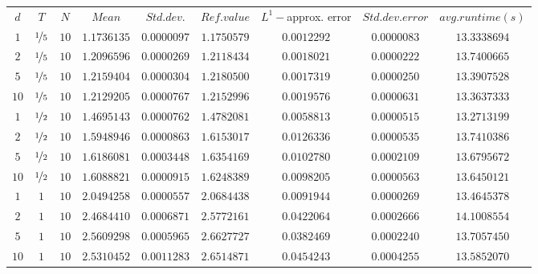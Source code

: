 \begin{tabular}{ccccccccc}
$d$ & $T$ & $N$ & $Mean$ & $Std. dev.$ & $Ref. value$ & $L^1-$approx. error & $Std. dev. error$ & $avg. runtime (s)$\\
$1$ & $\nicefrac{1}{5}$ & $10$ & $1.1736135$ & $0.0000097$ & $1.1750579$ & $0.0012292$ & $0.0000083$ & $13.3338694$\\
$2$ & $\nicefrac{1}{5}$ & $10$ & $1.2096596$ & $0.0000269$ & $1.2118434$ & $0.0018021$ & $0.0000222$ & $13.7400665$\\
$5$ & $\nicefrac{1}{5}$ & $10$ & $1.2159404$ & $0.0000304$ & $1.2180500$ & $0.0017319$ & $0.0000250$ & $13.3907528$\\
$10$ & $\nicefrac{1}{5}$ & $10$ & $1.2129205$ & $0.0000767$ & $1.2152996$ & $0.0019576$ & $0.0000631$ & $13.3637333$\\
$1$ & $\nicefrac{1}{2}$ & $10$ & $1.4695143$ & $0.0000762$ & $1.4782081$ & $0.0058813$ & $0.0000515$ & $13.2713199$\\
$2$ & $\nicefrac{1}{2}$ & $10$ & $1.5948946$ & $0.0000863$ & $1.6153017$ & $0.0126336$ & $0.0000535$ & $13.7410386$\\
$5$ & $\nicefrac{1}{2}$ & $10$ & $1.6186081$ & $0.0003448$ & $1.6354169$ & $0.0102780$ & $0.0002109$ & $13.6795672$\\
$10$ & $\nicefrac{1}{2}$ & $10$ & $1.6088821$ & $0.0000915$ & $1.6248389$ & $0.0098205$ & $0.0000563$ & $13.6450121$\\
$1$ & $1$ & $10$ & $2.0494258$ & $0.0000557$ & $2.0684438$ & $0.0091944$ & $0.0000269$ & $13.4645378$\\
$2$ & $1$ & $10$ & $2.4684410$ & $0.0006871$ & $2.5772161$ & $0.0422064$ & $0.0002666$ & $14.1008554$\\
$5$ & $1$ & $10$ & $2.5609298$ & $0.0005965$ & $2.6627727$ & $0.0382469$ & $0.0002240$ & $13.7057450$\\
$10$ & $1$ & $10$ & $2.5310452$ & $0.0011283$ & $2.6514871$ & $0.0454243$ & $0.0004255$ & $13.5852070$\\
\end{tabular}
